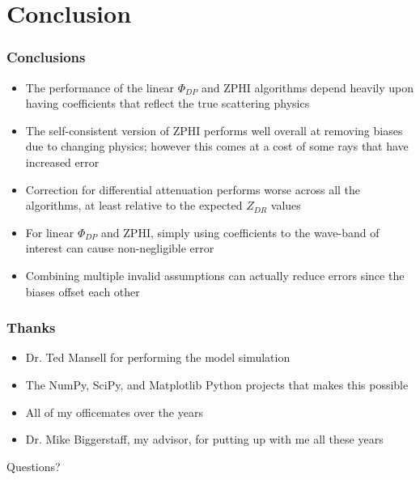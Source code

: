 \documentclass[red]{beamer}
\begin{document}
\section{Conclusion}
\begin{frame}[<+->]
	\frametitle{Conclusions}
	\begin{itemize}
		\item The performance of the linear $\Phi_{DP}$ and ZPHI algorithms depend heavily upon having coefficients
		that reflect the true scattering physics
		\item The self-consistent version of ZPHI performs well overall at removing biases due to changing physics; however this comes
		at a cost of some rays that have increased error
		\item Correction for differential attenuation performs worse across all the algorithms, at least relative to the expected $Z_{DR}$ values
		\item For linear $\Phi_{DP}$ and ZPHI, simply using coefficients to the wave-band of interest can cause non-negligible error
		\item Combining multiple invalid assumptions can actually reduce errors since the biases offset each other
	\end{itemize}
\end{frame}

\begin{frame}
	\frametitle{Thanks}
	\begin{itemize}
		\item Dr. Ted Mansell for performing the model simulation
		\item The NumPy, SciPy, and Matplotlib Python projects that makes this possible
		\item All of my officemates over the years
		\item Dr. Mike Biggerstaff, my advisor, for putting up with me all these years
	\end{itemize}
	\begin{center}
		\large{Questions?}
	\end{center}
\end{frame}
\end{document}
